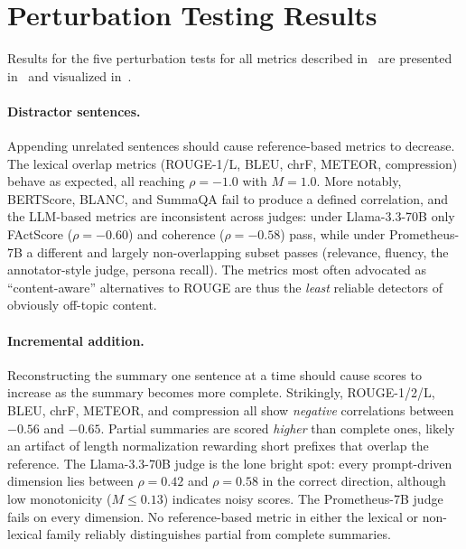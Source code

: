 \section[Perturbation Testing Results]{Perturbation Testing Results \hyperref[chsevenrq1]{\chsevenrqone}}

Results for the five perturbation tests for all metrics described in~ are presented in~ and visualized in~.

\paragraph{Distractor sentences.} Appending unrelated sentences should cause reference-based metrics to decrease. The lexical overlap metrics (ROUGE-1/L, BLEU, chrF, METEOR, compression) behave as expected, all reaching $\rho = -1.0$ with $M = 1.0$. More notably, BERTScore, BLANC, and SummaQA fail to produce a defined correlation, and the LLM-based metrics are inconsistent across judges: under Llama-3.3-70B only FActScore ($\rho = -0.60$) and coherence ($\rho = -0.58$) pass, while under Prometheus-7B a different and largely non-overlapping subset passes (relevance, fluency, the annotator-style judge, persona recall). The metrics most often advocated as ``content-aware'' alternatives to ROUGE are thus the \emph{least} reliable detectors of obviously off-topic content.

\paragraph{Incremental addition.} Reconstructing the summary one sentence at a time should cause scores to increase as the summary becomes more complete. Strikingly, ROUGE-1/2/L, BLEU, chrF, METEOR, and compression all show \emph{negative} correlations between $-0.56$ and $-0.65$. Partial summaries are scored \emph{higher} than complete ones, likely an artifact of length normalization rewarding short prefixes that overlap the reference. The Llama-3.3-70B judge is the lone bright spot: every prompt-driven dimension lies between $\rho = 0.42$ and $\rho = 0.58$ in the correct direction, although low monotonicity ($M \leq 0.13$) indicates noisy scores. The Prometheus-7B judge fails on every dimension. No reference-based metric in either the lexical or non-lexical family reliably distinguishes partial from complete summaries.

